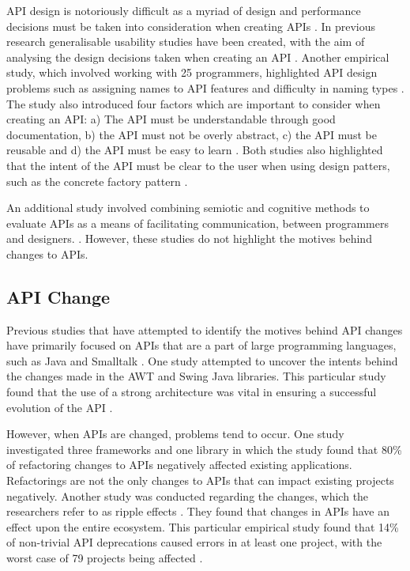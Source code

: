 \documentclass[10pt,twocolumn]{article}
\begin{document}
API design is notoriously difficult as a myriad of design and performance decisions must be taken into consideration when creating APIs \cite{bloch2008effective} \cite{afonso2012evaluating} \cite{stylos2006comparing}. In previous research generalisable usability studies have been created, with the aim of analysing the design decisions taken when creating an API \cite{stylos2006comparing}. Another empirical study, which involved working with 25 programmers, highlighted API design problems such as assigning names to API features and difficulty in naming types \cite{shi2011empirical}. The study also introduced four factors which are important to consider when creating an API: a) The API  must be understandable through good documentation, b) the API must not be overly abstract, c) the API must be reusable and d) the API must be easy to learn \cite{shi2011empirical}. Both studies also highlighted that the intent of the API must be clear to the user when using design patters, such as the concrete factory pattern \cite{shi2011empirical} \cite{stylos2006comparing}.

An additional study involved combining semiotic and cognitive methods to evaluate APIs as a means of facilitating communication, between programmers and designers. \cite{afonso2012evaluating}. However, these studies do not highlight the motives behind changes to APIs.

\subsection{API Change}
Previous studies that have attempted to identify the motives behind API changes have primarily focused on APIs that are a part of large programming languages, such as Java \cite{shi2011empirical} \cite{hou2011exploring} and Smalltalk \cite{robbes2012developers}. One study attempted to uncover the intents behind the changes made in the AWT and Swing Java libraries. This particular study found that the use of a strong architecture was vital in ensuring a successful evolution of the API \cite{hou2011exploring}.

However, when APIs are changed, problems tend to occur. One study \cite{dig2005role} investigated three frameworks and one library in which the study found that 80\% of refactoring changes to APIs negatively affected existing applications. Refactorings are not the only changes to APIs that can impact existing projects negatively. Another study was conducted regarding the changes, which the researchers refer to as ripple effects \cite{robbes2012developers}. They found that changes in APIs have an effect upon the entire ecosystem. This particular empirical study found that 14\% of non-trivial API deprecations caused errors in at least one project, with the worst case of 79 projects being affected \cite{robbes2012developers}.
\end{document}

